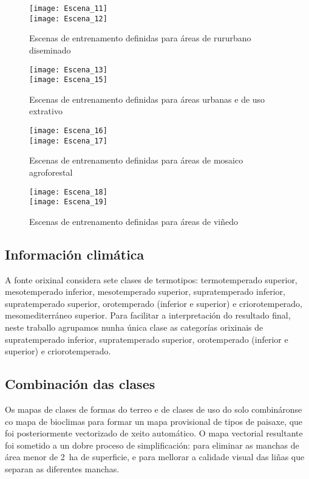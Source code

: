 \documentclass[11pt,a4paper]{article}
\begin{document}
\begin{figure}
\caption{Escenas de entrenamento definidas para áreas de rururbano diseminado}\label{fig:escenas5}
\texttt{[image: Escena\_11]}\\
\texttt{[image: Escena\_12]}
\end{figure}

\begin{figure}
\caption{Escenas de entrenamento definidas para áreas urbanas e de uso extrativo}\label{fig:escenas6}
\texttt{[image: Escena\_13]}\\
\texttt{[image: Escena\_15]}
\end{figure}

\begin{figure}
\caption{Escenas de entrenamento definidas para áreas de mosaico agroforestal}\label{fig:escenas7}
\texttt{[image: Escena\_16]}\\
\texttt{[image: Escena\_17]}
\end{figure}

\begin{figure}
\caption{Escenas de entrenamento definidas para áreas de viñedo}\label{fig:escenas8}
\texttt{[image: Escena\_18]}\\
\texttt{[image: Escena\_19]}
\end{figure}


\subsection{Información climática}

A fonte orixinal considera sete clases de termotipos: termotemperado superior, mesotemperado inferior, mesotemperado
superior, supratemperado inferior, supratemperado superior, orotemperado (inferior e superior) e criorotemperado, mesomediterráneo superior. Para facilitar a interpretación do resultado final, neste traballo agrupamos nunha única clase as categorías orixinais de supratemperado inferior, supratemperado superior, orotemperado (inferior e superior) e criorotemperado.

\subsection{Combinación das clases}

Os mapas de clases de formas do terreo e de clases de uso do solo combináronse co mapa de bioclimas para formar un mapa provisional de tipos de paisaxe, que foi posteriormente vectorizado de xeito automático. O mapa vectorial resultante foi sometido a un dobre proceso de simplificación: para eliminar as manchas de área menor de 2~ha de superficie, e para mellorar a calidade visual das liñas que separan as diferentes manchas.
\end{document}
